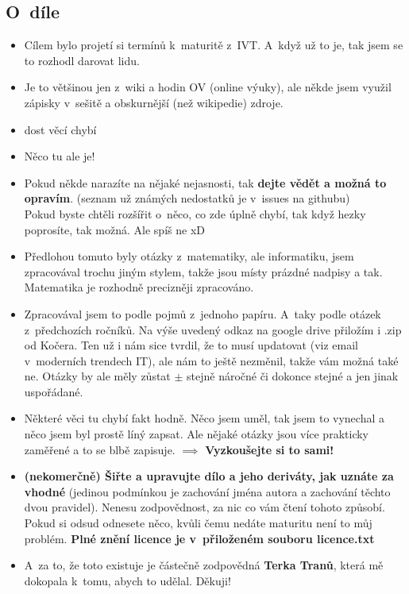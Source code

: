 \documentclass[12pt]{article}
\begin{document}
\subsection{O~díle}
\begin{itemize}
\item Cílem bylo projetí si termínů k~maturitě z~IVT.  A~když už to je, tak jsem se to rozhodl darovat lidu.
\item Je to většinou jen z~wiki a hodin OV (online výuky), ale někde jsem využil zápisky v~sešitě a obskurnější (než wikipedie) zdroje.
\item dost věcí chybí
\item Něco tu ale je!
\item Pokud někde narazíte na nějaké nejasnosti, tak \textbf{dejte vědět a možná to opravím}. (seznam už známých nedostatků je v~issues na githubu)\\
Pokud byste chtěli rozšířit o~něco, co zde úplně chybí, tak když hezky poprosíte, tak možná. Ale spíš ne xD
\item Předlohou tomuto byly otázky z~matematiky, ale informatiku, jsem zpracovával trochu jiným stylem, takže jsou místy prázdné nadpisy a tak. Matematika je rozhodně precizněji zpracováno.
\item Zpracovával jsem to podle pojmů z~jednoho papíru. A~taky podle otázek z~předchozích ročníků. Na výše uvedený odkaz na google drive přiložím i .zip od Kočera. Ten už i nám sice tvrdil, že to musí updatovat (viz email v~moderních trendech IT), ale nám to ještě nezměnil, takže vám možná také ne. Otázky by ale měly zůstat $\pm$ stejně náročné či dokonce stejné a jen jinak uspořádané.
\item Některé věci tu chybí fakt hodně. Něco jsem uměl, tak jsem to vynechal a něco jsem byl prostě líný zapsat. Ale nějaké otázky jsou více prakticky zaměřené a to se blbě zapisuje. $\implies$ \textbf{Vyzkoušejte si to sami!}
\item \textbf{(nekomerčně) Šiřte a upravujte dílo a jeho deriváty, jak uznáte za vhodné} (jedinou podmínkou je zachování jména autora a zachování těchto dvou pravidel). Nenesu zodpovědnost, za nic co vám čtení tohoto způsobí. Pokud si odsud odnesete něco, kvůli čemu nedáte maturitu není to můj problém.
\textbf{Plné znění licence je v~přiloženém souboru licence.txt}
\item A~za to, že toto existuje je částečně zodpovědná \textbf{Terka Tranů}, která mě dokopala k~tomu, abych to udělal. Děkuji!
\end{itemize}
\end{document}
